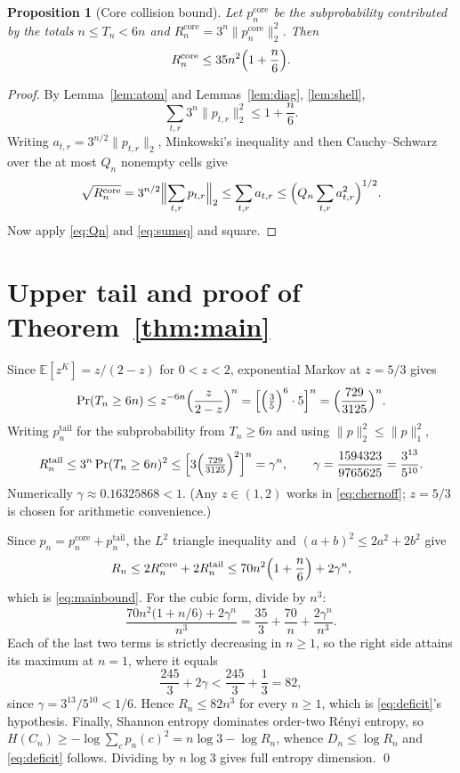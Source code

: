 \documentclass[11pt,reqno]{amsart}
\theoremstyle{plain}
\newtheorem{proposition}[theorem]{Proposition}
\theoremstyle{definition}
\theoremstyle{remark}
\newcommand{\E}{\mathbb{E}}
\newcommand{\Prob}{\operatorname{Pr}}
\begin{document}
\begin{proposition}[Core collision bound]\label{prop:core}
Let $p_n^{\mathrm{core}}$ be the subprobability contributed by the totals
$n\le T_n<6n$ and $R_n^{\mathrm{core}}=3^n\|p_n^{\mathrm{core}}\|_2^2$. Then
\begin{equation}
R_n^{\mathrm{core}}\le35n^2\Bigl(1+\frac n6\Bigr).
\label{eq:corebound}
\end{equation}
\end{proposition}

\begin{proof}
By Lemma~\ref{lem:atom} and Lemmas~\ref{lem:diag}, \ref{lem:shell},
\begin{equation}
\sum_{t,r}3^n\|p_{t,r}\|_2^2\le1+\frac n6 .
\label{eq:sumsq}
\end{equation}
Writing $a_{t,r}=3^{n/2}\|p_{t,r}\|_2$, Minkowski's inequality and then
Cauchy--Schwarz over the at most $Q_n$ nonempty cells give
\[
\sqrt{R_n^{\mathrm{core}}}
=3^{n/2}\Bigl\|\sum_{t,r}p_{t,r}\Bigr\|_2
\le\sum_{t,r}a_{t,r}
\le\Bigl(Q_n\sum_{t,r}a_{t,r}^2\Bigr)^{1/2}.
\]
Now apply \eqref{eq:Qn} and \eqref{eq:sumsq} and square.
\end{proof}

\section{Upper tail and proof of Theorem~\ref{thm:main}}\label{sec:proof}

Since $\E[z^K]=z/(2-z)$ for $0<z<2$, exponential Markov at $z=5/3$ gives
\begin{equation}
\Prob(T_n\ge6n)\le z^{-6n}\Bigl(\frac z{2-z}\Bigr)^n
=\Bigl[\Bigl(\tfrac35\Bigr)^6\cdot5\Bigr]^n
=\Bigl(\frac{729}{3125}\Bigr)^n .
\label{eq:chernoff}
\end{equation}
Writing $p_n^{\mathrm{tail}}$ for the subprobability from $T_n\ge6n$ and
using $\|p\|_2^2\le\|p\|_1^2$,
\begin{equation}
R_n^{\mathrm{tail}}\le3^n\Prob(T_n\ge6n)^2
\le\Bigl[3\Bigl(\tfrac{729}{3125}\Bigr)^2\Bigr]^n=\gamma^n,
\qquad
\gamma=\frac{1594323}{9765625}=\frac{3^{13}}{5^{10}} .
\label{eq:tail}
\end{equation}
Numerically $\gamma\approx0.16325868<1$. (Any $z\in(1,2)$ works in
\eqref{eq:chernoff}; $z=5/3$ is chosen for arithmetic convenience.)

Since $p_n=p_n^{\mathrm{core}}+p_n^{\mathrm{tail}}$, the $L^2$ triangle
inequality and $(a+b)^2\le2a^2+2b^2$ give
\[
R_n\le2R_n^{\mathrm{core}}+2R_n^{\mathrm{tail}}
\le70n^2\Bigl(1+\frac n6\Bigr)+2\gamma^n,
\]
which is \eqref{eq:mainbound}. For the cubic form, divide by $n^3$:
\[
\frac{70n^2\bigl(1+n/6\bigr)+2\gamma^n}{n^3}
=\frac{35}3+\frac{70}n+\frac{2\gamma^n}{n^3}.
\]
Each of the last two terms is strictly decreasing in $n\ge1$, so the right
side attains its maximum at $n=1$, where it equals
\[
\frac{245}3+2\gamma<\frac{245}3+\frac13=82,
\]
since $\gamma=3^{13}/5^{10}<1/6$. Hence $R_n\le82n^3$ for every $n\ge1$,
which is \eqref{eq:deficit}'s hypothesis.
Finally, Shannon entropy dominates order-two R\'enyi entropy, so
$H(C_n)\ge-\log\sum_cp_n(c)^2=n\log3-\log R_n$, whence $D_n\le\log R_n$ and
\eqref{eq:deficit} follows. Dividing by $n\log3$ gives full entropy
dimension. \qed
\end{document}
